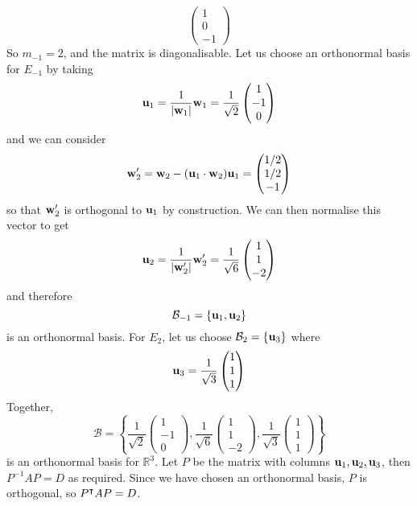 \documentclass{article}
\begin{document}
\begin{enumerate}[(i)]
\[\begin{pmatrix}
			      1 \\ 0 \\ -1
		      \end{pmatrix} \]
	      So $m_{-1} = 2$, and the matrix is diagonalisable. Let us choose an orthonormal basis for $E_{-1}$ by taking
	      \[ \vb u_1 = \frac{1}{\abs{\vb w_1}}\vb w_1 = \frac{1}{\sqrt 2}\begin{pmatrix}
			      1 \\ -1 \\ 0
		      \end{pmatrix} \]
	      and we can consider
	      \[ \vb w_2' = \vb w_2 - (\vb u_1 \cdot \vb w_2)\vb u_1 = \begin{pmatrix}
			      1/2 \\ 1/2 \\ -1
		      \end{pmatrix} \]
	      so that $\vb w_2'$ is orthogonal to $\vb u_1$ by construction. We can then normalise this vector to get
	      \[ \vb u_2 = \frac{1}{\abs{\vb w_2'}}\vb w_2' = \frac{1}{\sqrt 6} \begin{pmatrix}
			      1 \\ 1 \\ -2
		      \end{pmatrix} \]
	      and therefore
	      \[ \mathcal B_{-1} = \{ \vb u_1, \vb u_2 \} \]
	      is an orthonormal basis. For $E_2$, let us choose $\mathcal B_2 = \{ \vb u_3 \}$ where
	      \[ \vb u_3 = \frac{1}{\sqrt 3}\begin{pmatrix}
			      1 \\ 1 \\ 1
		      \end{pmatrix} \]
	      Together,
	      \[ \mathcal B = \left\{ \frac{1}{\sqrt 2}\begin{pmatrix}
			      1 \\ -1 \\ 0
		      \end{pmatrix}, \frac{1}{\sqrt 6} \begin{pmatrix}
			      1 \\ 1 \\ -2
		      \end{pmatrix}, \frac{1}{\sqrt 3}\begin{pmatrix}
			      1 \\ 1 \\ 1
		      \end{pmatrix} \right\} \]
	      is an orthonormal basis for $\mathbb R^3$. Let $P$ be the matrix with columns $\vb u_1, \vb u_2, \vb u_3$, then $P^{-1}AP = D$ as required. Since we have chosen an orthonormal basis, $P$ is orthogonal, so $P^\intercal AP = D$.
\end{enumerate}
\end{document}

